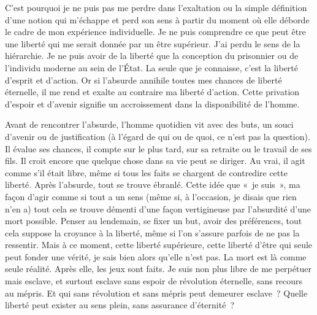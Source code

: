 \documentclass{book}
\begin{document}
C'est pourquoi je ne puis pas me perdre dans l'exaltation ou la simple définition d'une notion qui m'échappe et perd son sens à partir du moment où elle déborde le cadre de mon expérience individuelle. Je ne puis comprendre ce que peut être une liberté qui me serait donnée par un être supérieur. J'ai perdu le sens de la hiérarchie. Je ne puis avoir de la liberté que la conception du prisonnier ou de l'individu moderne au sein de l'État. La seule que je connaisse, c'est la liberté d'esprit et d'action. Or si l'absurde annihile toutes mes chances de liberté éternelle, il me rend et exalte au contraire ma liberté d'action. Cette privation d'espoir et d'avenir signifie un accroissement dans la disponibilité de l'homme.

Avant de rencontrer l'absurde, l'homme quotidien vit avec des buts, un souci d'avenir ou de justification (à l'égard de qui ou de quoi, ce n'est pas la question). Il évalue ses chances, il compte sur le plus tard, sur sa retraite ou le travail de ses fils. Il croit encore que quelque chose dans sa vie peut se diriger. Au vrai, il agit comme s'il était libre, même si tous les faits se chargent de contredire cette liberté. Après l'absurde, tout se trouve ébranlé. Cette idée que « je suis », ma façon d'agir comme si tout a un sens (même si, à l'occasion, je disais que rien n'en a) tout cela se trouve démenti d'une façon vertigineuse par l'absurdité d'une mort possible. Penser au lendemain, se fixer un but, avoir des préférences, tout cela suppose la croyance à la liberté, même si l'on s'assure parfois de ne pas la ressentir. Mais à ce moment, cette liberté supérieure, cette liberté d'être qui seule peut fonder une vérité, je sais bien alors qu'elle n'est pas. La mort est là comme seule réalité. Après elle, les jeux sont faits. Je suis non plus libre de me perpétuer mais esclave, et surtout esclave sans espoir de révolution éternelle, sans recours au mépris. Et qui sans révolution et sans mépris peut demeurer esclave ? Quelle liberté peut exister au sens plein, sans assurance d'éternité ?
\end{document}
